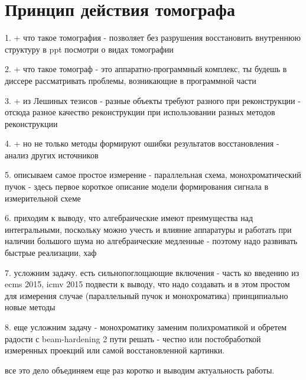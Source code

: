 \section{Принцип действия томографа}


1. + что такое томография - позволяет без разрушения восстановить внутреннюю структуру в ppt посмотри о видах томографии	

2. + что такое томограф - это аппаратно-программный комплекс, ты будешь в диссере рассматривать проблемы, возникающие в программной части

3. + из Лешиных тезисов - разные объекты требуют разного при реконструкции - отсюда разное качество реконструкции при использовании разных методов реконструкции
  
4. + но не только методы формируют ошибки результатов восстановления - анализ других источников

5. описываем самое простое измерение - параллельная схема, монохроматический пучок - здесь первое короткое описание модели формирования сигнала в измерительной схеме

6. приходим к выводу, что алгебраические имеют преимущества над интегральными, поскольку можно учесть и влияние аппаратуры и работать при наличии большого шума
но алгебраические медленные - поэтому надо развивать быстрые реализации, хаф

7. усложним задачу. есть сильнопоглощающие включения - часть ко введению из ecms 2015, icmv 2015 подвести к выводу, что надо создавать и в этом простом для измерения случае (параллельный пучок и монохроматика) принципиально новые методы

8. еще усложним задачу - монохроматику заменим полихроматикой и обретем радости с beam-hardening 2 пути решать - честно или постобработкой измеренных проекций или самой восстановленной картинки.

все это дело объединяем еще раз коротко и выводим актуальность работы.

